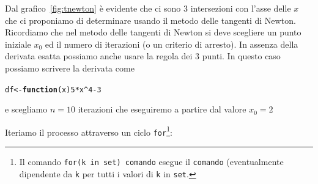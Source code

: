 \documentclass[onecolumn,11pt]{book}\usepackage[]{graphicx}\usepackage[]{color}
\makeatletter
\newcommand{\hlnum}[1]{\textcolor[rgb]{0.686,0.059,0.569}{#1}}%
\newcommand{\hlopt}[1]{\textcolor[rgb]{0,0,0}{#1}}%
\newcommand{\hlstd}[1]{\textcolor[rgb]{0.345,0.345,0.345}{#1}}%
\newcommand{\hlkwa}[1]{\textcolor[rgb]{0.161,0.373,0.58}{\textbf{#1}}}%
\newcommand{\hlkwb}[1]{\textcolor[rgb]{0.69,0.353,0.396}{#1}}%
\newcommand{\hlkwc}[1]{\textcolor[rgb]{0.333,0.667,0.333}{#1}}%
\newenvironment{kframe}{%
 \def\at@end@of@kframe{}%
 \ifinner\ifhmode%
  \def\at@end@of@kframe{\end{minipage}}%
  \begin{minipage}{\columnwidth}%
 \fi\fi%
 \def\FrameCommand##1{\hskip\@totalleftmargin \hskip-\fboxsep
 \colorbox{shadecolor}{##1}\hskip-\fboxsep
     \hskip-\linewidth \hskip-\@totalleftmargin \hskip\columnwidth}%
 \MakeFramed {\advance\hsize-\width
   \@totalleftmargin\z@ \linewidth\hsize
   \@setminipage}}%
 {\par\unskip\endMakeFramed%
 \at@end@of@kframe}
\newenvironment{knitrout}{}{} %
\makeatother
\begin{document}
Dal grafico~\ref{fig:tnewton} \`e evidente che ci sono 3 intersezioni con l'asse delle $x$ che ci proponiamo di determinare usando il metodo delle tangenti di Newton. Ricordiamo che nel metodo delle tangenti di Newton si deve scegliere un punto iniziale $x_0$  ed il numero di iterazioni (o un criterio di arresto).
In assenza della derivata esatta possiamo anche usare la regola dei 3 punti. In questo caso possiamo scrivere la derivata come
\begin{knitrout}
\color{fgcolor}\begin{kframe}
\begin{alltt}
\hlstd{df}\hlkwb{<-}\hlkwa{function}\hlstd{(}\hlkwc{x}\hlstd{)} \hlnum{5}\hlopt{*}\hlstd{x}\hlopt{^}\hlnum{4}\hlopt{-}\hlnum{3}
\end{alltt}
\end{kframe}
\end{knitrout}
e scegliamo $n=10$ iterazioni che eseguiremo  a partire dal valore $x_0=2$

Iteriamo il processo attraverso un ciclo \texttt{for}\footnote{Il comando   \texttt{for(k in set) comando} esegue il \texttt{comando} (eventualmente dipendente da \texttt{k} per tutti i valori di \texttt{k} in \texttt{set}. }:
\end{document}
